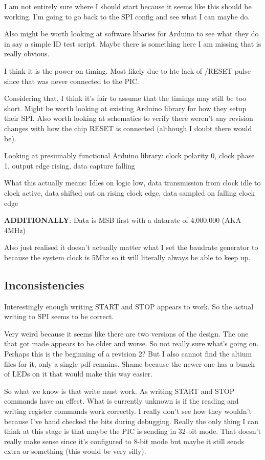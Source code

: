 I am not entirely sure where I should start because it seems like this should be working.
I'm going to go back to the SPI config and see what I can maybe do.

Also might be worth looking at software libaries for Arduino to see what they do in say
a simple ID test script.
Maybe there is something here I am missing that is really obvious.

I think it is the power-on timing. Most likely due to hte lack of /RESET pulse since
that was never connected to the PIC.

Considering that, I think it's fair to assume that the timings may still be too short.
Might be worth looking at existing Arduino library for how they setup their SPI.
Also worth looking at schematics to verify there weren't any revision changes with how
the chip RESET is connected (although I doubt there would be).

Looking at presumably functional Arduino library:
clock polarity 0, clock phase 1, output edge rising, data capture falling

What this actually means:
Idles on logic low, data transmission from clock idle to clock active,
data shifted out on rising clock edge, data sampled on falling clock edge

\textbf{ADDITIONALLY}: Data is MSB first with a datarate of 4,000,000 (AKA 4MHz)

Also just realised it doesn't actually matter what I set the baudrate generator to because
the system clock is 5Mhz so it will literally always be able to keep up.


\subsection{Inconsistencies}
Interestingly enough writing START and STOP appears to work.
So the actual writing to SPI seems to be correct.

Very weird because it seems like there are two versions of the design.
The one that got made appears to be older and worse. So not really sure what's going on.
Perhaps this is the beginning of a revision 2?
But I also cannot find the altium files for it, only a single pdf remains.
Shame because the newer one has a bunch of LEDs on it that would make this way easier.

So what we know is that write must work. As writing START and STOP commands have
an effect.
What is currently unknown is if the reading and writing register commands work correctly.
I really don't see how they wouldn't because I've hand checked the bits during debugging.
Really the only thing I can think at this stage is that maybe the PIC is sending in 32-bit
mode. That doesn't really make sense since it's configured to 8-bit mode but maybe it
still sends extra or something (this would be very silly).

